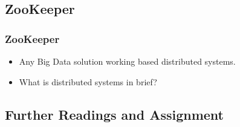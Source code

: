 
\subsection{ZooKeeper}
\begin{frame}
\frametitle{ZooKeeper}
\begin{itemize} 
	\item Any Big Data solution working based distributed systems.
	\item What is distributed systems in brief?
\end{itemize}
\end{frame}

\subsection{Further Readings and Assignment}


